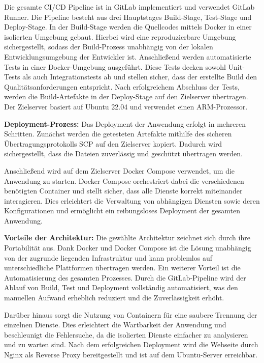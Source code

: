 \documentclass[conference,a4paper,flushend]{cs-techrep}
\begin{document}
Die gesamte CI/CD Pipeline ist in GitLab implementiert und verwendet GitLab Runner. Die Pipeline besteht aus drei Hauptstages Build-Stage, Test-Stage und Deploy-Stage.
In der Build-Stage werden die Quellcodes mittels Docker in einer isolierten Umgebung gebaut. Hierbei wird eine reproduzierbare Umgebung sichergestellt, sodass der Build-Prozess unabhängig von der lokalen Entwicklungsumgebung der Entwickler ist.
Anschließend werden automatisierte Tests in einer Docker-Umgebung ausgeführt. Diese Tests decken sowohl Unit-Tests als auch Integrationstests ab und stellen sicher, dass der erstellte Build den Qualitätsanforderungen entspricht.
Nach erfolgreichem Abschluss der Tests, werden die Build-Artefakte in der Deploy-Stage auf den Zielserver übertragen. Der Zielserver basiert auf Ubuntu 22.04 und verwendet einen ARM-Prozessor.

\textbf{Deployment-Prozess:}
Das Deployment der Anwendung erfolgt in mehreren Schritten. Zunächst werden die getesteten Artefakte mithilfe des sicheren Übertragungsprotokolls SCP auf den Zielserver kopiert. Dadurch wird sichergestellt, dass die Dateien zuverlässig und geschützt übertragen werden.

Anschließend wird auf dem Zielserver Docker Compose verwendet, um die Anwendung zu starten. Docker Compose orchestriert dabei die verschiedenen benötigten Container und stellt sicher, dass alle Dienste korrekt miteinander interagieren. Dies erleichtert die Verwaltung von abhängigen Diensten sowie deren Konfigurationen und ermöglicht ein reibungsloses Deployment der gesamten Anwendung.

\textbf{Vorteile der Architektur:}
Die gewählte Architektur zeichnet sich durch ihre Portabilität aus. Dank Docker und Docker Compose ist die Lösung unabhängig von der zugrunde liegenden Infrastruktur und kann problemlos auf unterschiedliche Plattformen übertragen werden. Ein weiterer Vorteil ist die Automatisierung des gesamten Prozesses. Durch die GitLab-Pipeline wird der Ablauf von Build, Test und Deployment vollständig automatisiert, was den manuellen Aufwand erheblich reduziert und die Zuverlässigkeit erhöht.

Darüber hinaus sorgt die Nutzung von Containern für eine saubere Trennung der einzelnen Dienste. Dies erleichtert die Wartbarkeit der Anwendung und beschleunigt die Fehlersuche, da die isolierten Dienste einfacher zu analysieren und zu warten sind.
Nach dem erfolgreichen Deployment wird die Webseite durch Nginx als Reverse Proxy bereitgestellt und ist auf dem Ubuntu-Server erreichbar.
\end{document}

